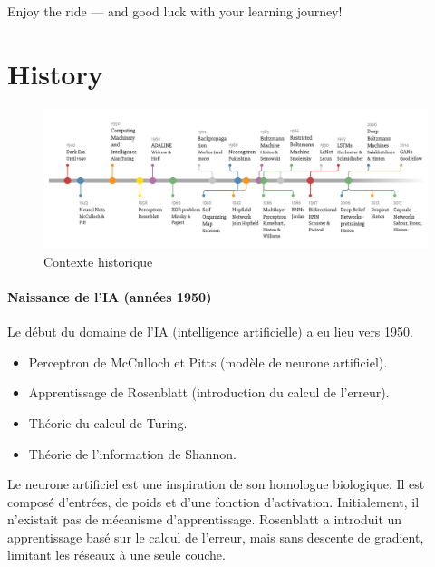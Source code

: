 \documentclass{article}
\begin{document}
Enjoy the ride — and good luck with your learning journey!

\newpage

\tableofcontents
\newpage

\section{History} \label{sec:history}

\begin{figure}[ht]
    \centering
    \includegraphics[width=1\linewidth]{graphics/S1History/ai_history.png}
    \caption{Contexte historique}
    \label{fig:ai-history}
\end{figure}

\paragraph{Naissance de l'IA (années 1950)}
Le début du domaine de l'IA (intelligence artificielle) a eu lieu vers 1950.
\begin{itemize}
    \item Perceptron de McCulloch et Pitts (modèle de neurone artificiel).
    \item Apprentissage de Rosenblatt (introduction du calcul de l'erreur).
    \item Théorie du calcul de Turing.
    \item Théorie de l'information de Shannon.
\end{itemize}

Le neurone artificiel est une inspiration de son homologue biologique. Il est composé d'entrées, de poids et d'une fonction d'activation. Initialement, il n'existait pas de mécanisme d'apprentissage. Rosenblatt a introduit un apprentissage basé sur le calcul de l'erreur, mais sans descente de gradient, limitant les réseaux à une seule couche.
\end{document}
